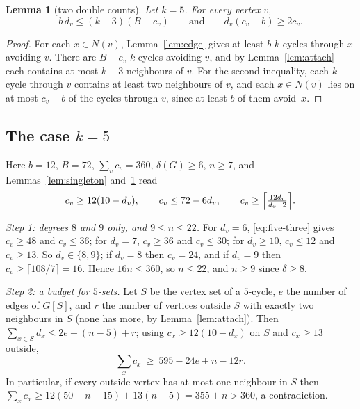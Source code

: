 \documentclass[11pt]{article}
\newtheorem{lemma}{Lemma}
\theoremstyle{remark}
\begin{document}
\begin{lemma}[two double counts]\label{lem:double}
Let $k=5$. For every vertex $v$,
\[
b\,d_v\le (k-3)(B-c_v)\qquad\text{and}\qquad d_v(c_v-b)\ge 2c_v .
\]
\end{lemma}

\begin{proof}
For each $x\in N(v)$, Lemma~\ref{lem:edge} gives at least $b$ $k$-cycles
through $x$ avoiding $v$. There are $B-c_v$ $k$-cycles avoiding $v$, and by
Lemma~\ref{lem:attach} each contains at most $k-3$ neighbours of $v$. For the
second inequality, each $k$-cycle through $v$ contains at least two neighbours
of $v$, and each $x\in N(v)$ lies on at most $c_v-b$ of the cycles through $v$,
since at least $b$ of them avoid~$x$.
\end{proof}

\subsection{The case $k=5$}

Here $b=12$, $B=72$, $\sum_v c_v=360$, $\delta(G)\ge6$, $n\ge7$, and
Lemmas~\ref{lem:singleton} and~\ref{lem:double} read
\begin{equation}\label{eq:five-three}
c_v\ge12(10-d_v),\qquad c_v\le72-6d_v,\qquad
c_v\ge\Bigl\lceil\tfrac{12d_v}{d_v-2}\Bigr\rceil .
\end{equation}

\emph{Step 1: degrees $8$ and $9$ only, and $9\le n\le22$.} For $d_v=6$,
\eqref{eq:five-three} gives $c_v\ge48$ and $c_v\le36$; for $d_v=7$, $c_v\ge36$
and $c_v\le30$; for $d_v\ge10$, $c_v\le12$ and $c_v\ge13$. So
$d_v\in\{8,9\}$; if $d_v=8$ then $c_v=24$, and if $d_v=9$ then
$c_v\ge\lceil108/7\rceil=16$. Hence $16n\le360$, so $n\le22$, and $n\ge9$
since $\delta\ge8$.

\emph{Step 2: a budget for $5$-sets.} Let $S$ be the vertex set of a $5$-cycle,
$e$ the number of edges of $G[S]$, and $r$ the number of vertices outside $S$
with exactly two neighbours in $S$ (none has more, by Lemma~\ref{lem:attach}).
Then $\sum_{x\in S}d_x\le 2e+(n-5)+r$; using $c_x\ge12(10-d_x)$ on $S$ and
$c_x\ge13$ outside,
\begin{equation}\label{eq:five-budget}
\sum_x c_x\ \ge\ 595-24e+n-12r .
\end{equation}
In particular, if every outside vertex has at most one neighbour in $S$
then $\sum_x c_x\ge 12(50-n-15)+13(n-5)=355+n>360$, a contradiction.
\end{document}

